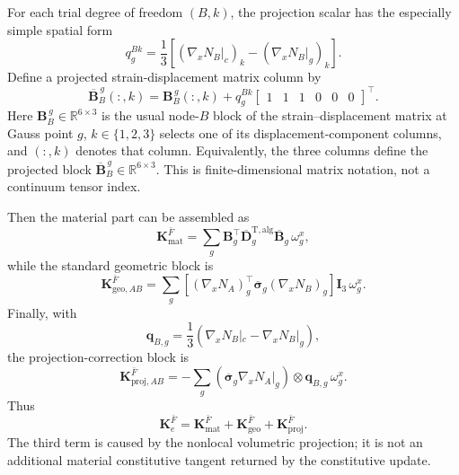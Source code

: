 \documentclass[11pt,a4paper]{article}
\newcommand{\bs}[1]{\boldsymbol{#1}}
\newcommand{\R}{\mathbb{R}}
\newcommand{\sigb}{\overline{\bs{\sigma}}}
\newcommand{\vct}[1]{\mathbf{#1}}
\begin{document}
For each trial degree of freedom $(B,k)$, the projection scalar has the especially simple spatial form
\begin{equation}
\boxed{
q_g^{Bk}
=\frac{1}{3}
\left[
(\nabla_xN_B|_c)_k-(\nabla_xN_B|_g)_k
\right].
}
\label{eq:fbar-q-spatial}
\end{equation}
Define a projected strain-displacement matrix column by
\begin{equation}
\overline{\vct B}^{\,g}_{B}(:,k)
=
\vct B^{\,g}_{B}(:,k)
+q_g^{Bk}
\begin{bmatrix}1&1&1&0&0&0\end{bmatrix}^{\top}.
\label{eq:fbar-Bbar}
\end{equation}
Here $\vct B_B^{\,g}\in\R^{6\times3}$ is the usual node-$B$ block of the strain--displacement matrix at Gauss point $g$, $k\in\{1,2,3\}$ selects one of its displacement-component columns, and $(:,k)$ denotes that column. Equivalently, the three columns define the projected block $\overline{\vct B}_B^{\,g}\in\R^{6\times3}$. This is finite-dimensional matrix notation, not a continuum tensor index.

Then the material part can be assembled as
\begin{equation}
\boxed{
\vct K_{\mathrm{mat}}^{\bar F}
=\sum_g
\vct B_g^\top
\overline{\vct D}^{\mathrm{T,alg}}_g
\overline{\vct B}_g\,\omega_g^x,
}
\label{eq:fbar-Kmat-spatial}
\end{equation}
while the standard geometric block is
\begin{equation}
\vct K_{\mathrm{geo},AB}^{\bar F}
=\sum_g
\left[(\nabla_xN_A)_g^\top\sigb_g(\nabla_xN_B)_g\right]
\vct I_3\,\omega_g^x.
\end{equation}
Finally, with
\begin{equation}
\bs q_{B,g}
=\frac{1}{3}\left(\nabla_xN_B|_c-\nabla_xN_B|_g\right),
\end{equation}
the projection-correction block is
\begin{equation}
\boxed{
\vct K_{\mathrm{proj},AB}^{\bar F}
=-\sum_g
\left(\sigb_g\nabla_xN_A|_g\right)
\otimes\bs q_{B,g}\,\omega_g^x.
}
\label{eq:fbar-Kproj}
\end{equation}
Thus
\begin{equation}
\boxed{
\vct K_e^{\bar F}
=
\vct K_{\mathrm{mat}}^{\bar F}
+\vct K_{\mathrm{geo}}^{\bar F}
+\vct K_{\mathrm{proj}}^{\bar F}.
}
\label{eq:fbar-Ksplit}
\end{equation}
The third term is caused by the nonlocal volumetric projection; it is not an additional material constitutive tangent returned by the constitutive update.
\end{document}
